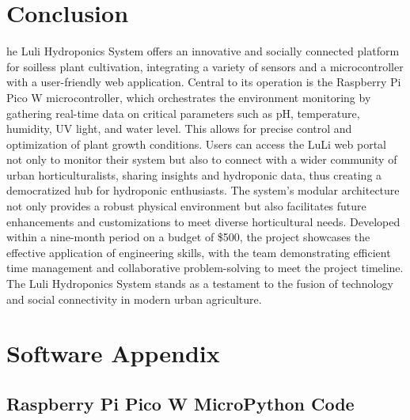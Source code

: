 \documentclass[12pt]{article} %
\begin{document}
\section{Conclusion}
\noindent he Luli Hydroponics System offers an innovative and socially connected platform for soilless plant cultivation, integrating a variety of sensors and a microcontroller with a user-friendly web application. Central to its operation is the Raspberry Pi Pico W microcontroller, which orchestrates the environment monitoring by gathering real-time data on critical parameters such as pH, temperature, humidity, UV light, and water level. This allows for precise control and optimization of plant growth conditions. Users can access the LuLi web portal not only to monitor their system but also to connect with a wider community of urban horticulturalists, sharing insights and hydroponic data, thus creating a democratized hub for hydroponic enthusiasts. The system’s modular architecture not only provides a robust physical environment but also facilitates future enhancements and customizations to meet diverse horticultural needs. Developed within a nine-month period on a budget of \$500, the project showcases the effective application of engineering skills, with the team demonstrating efficient time management and collaborative problem-solving to meet the project timeline. The Luli Hydroponics System stands as a testament to the fusion of technology and social connectivity in modern urban agriculture.

\appendix
\pagebreak
\section{Software Appendix}
\subsection{Raspberry Pi Pico W MicroPython Code}
\end{document}
